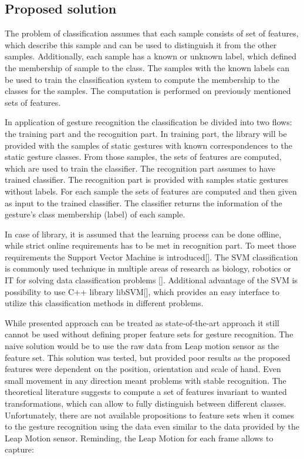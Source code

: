 \subsection{Proposed solution}

The problem of classification assumes that each sample consists of set of features, which describe this sample and can be used to distinguish it from the other samples.
Additionally, each sample has a known or unknown label, which defined the membership of sample to the class. 
The samples with the known labels can be used to train the classification system to compute the membership to the classes for the samples. 
The computation is performed on previously mentioned sets of features.

In application of gesture recognition the classification be divided into two flows: the training part and the recognition part. 
In training part, the library will be provided with the samples of static gestures with known correspondences to the static gesture classes. 
From those samples, the sets of features are computed, which are used to train the classifier.
The recognition part assumes to have trained classifier. 
The recognition part is provided with samples static gestures without labels. 
For each sample the sets of features are computed and then given as input to the trained classifier.
The classifier returns the information of the gesture's class membership (label) of each sample.

In case of library, it is assumed that the learning process can be done offline, while strict online requirements has to be met in recognition part. 
To meet those requirements the Support Vector Machine is introduced[]. 
The SVM classification is commonly used technique in multiple areas of research as biology, robotics or IT for solving data classification problems [].
Additional advantage of the SVM is possibility to use C++ library libSVM[], which provides an easy interface to utilize this classification methods in different problems.

While presented approach can be treated as state-of-the-art approach it still cannot be used without defining proper feature sets for gesture recognition.
The naive solution would be to use the raw data from Leap motion sensor as the feature set.
This solution was tested, but provided poor results as the proposed features were dependent on the position, orientation and scale of hand. 
Even small movement in any direction meant problems with stable recognition. 
The theoretical literature suggests to compute a set of features invariant to wanted transformations, which can allow to fully distinguish between different classes.
Unfortunately, there are not available propositions to feature sets when it comes to the gesture recognition using the data even similar to the data provided by the Leap Motion sensor.
Reminding, the Leap Motion for each frame allows to capture:

